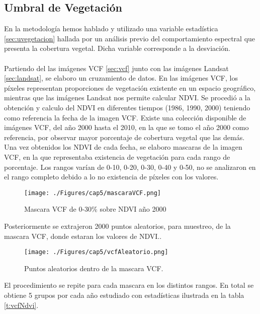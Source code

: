 \subsection{Umbral de Vegetaci\'on}\label{subsec:umbralVegetacion}
En la metodolog\'ia hemos hablado y utilizado una variable estad\'istica \ref{sec:uvegetacion} hallada por un an\'alisis previo del comportamiento espectral que presenta la cobertura vegetal. Dicha variable corresponde a la desviaci\'on.\\~\\
Partiendo del las im\'agenes VCF \ref{sec:vcf} junto con las im\'agenes Landsat \ref{sec:landsat}, se elaboro un cruzamiento de datos. En las im\'agenes VCF, los p\'ixeles representan proporciones de vegetaci\'on existente en un espacio geogr\'afico, mientras que las im\'agenes Landsat nos permite calcular NDVI. Se procedi\'o a la obtenci\'on y calculo del NDVI en diferentes tiempos (1986, 1990, 2000) teniendo como referencia la fecha de la imagen VCF. Existe una colecci\'on disponible de im\'agenes VCF, del a\~{n}o 2000 hasta el 2010, en la que se tomo el a\~{n}o 2000 como referencia, por observar mayor porcentaje de cobertura vegetal que las dem\'as. Una vez obtenidos los NDVI de cada fecha, se elaboro mascaras de la imagen VCF, en la que representaba existencia de vegetaci\'on para cada rango de porcentaje. Los rangos var\'ian de 0-10, 0-20, 0-30, 0-40 y 0-50, no se analizaron en el rango completo debido a lo no existencia de p\'ixeles con los valores.
\begin{figure}[H]
	\centering
	\texttt{[image: ./Figures/cap5/mascaraVCF.png]}
	\caption{Mascara VCF de 0-30\% sobre NDVI a\~{n}o 2000}
	\label{fig:mascVCf}
\end{figure}
Posteriormente se extrajeron 2000 puntos aleatorios, para muestreo, de la mascara VCF, donde estaran los valores de NDVI..
\begin{figure}[H]
	\centering
	\texttt{[image: ./Figures/cap5/vcfAleatorio.png]}
	\caption{Puntos aleatorios dentro de la mascara VCF.}
	\label{fig:aleatorioVCf}
\end{figure}
El procedimiento se repite para cada mascara en los distintos rangos. En total se obtiene 5 grupos por cada a\~{n}o estudiado con estad\'isticas ilustrada en la tabla \ref{t:vcfNdvi}.

